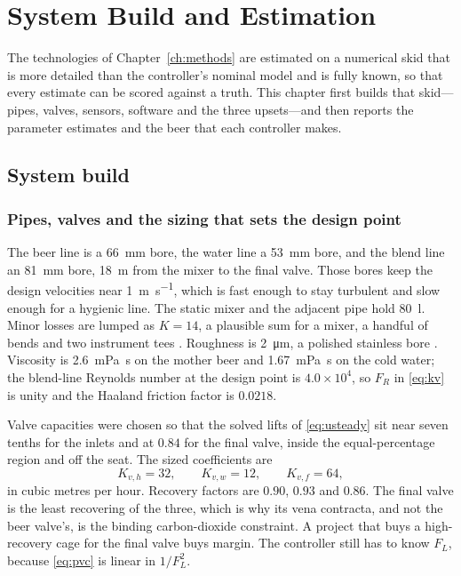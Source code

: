 \chapter{System Build and Estimation}
\label{ch:estimate}

The technologies of Chapter~\ref{ch:methods} are estimated on a numerical skid that is more detailed than the controller's nominal model and is fully known, so that every estimate can be scored against a truth. This chapter first builds that skid---pipes, valves, sensors, software and the three upsets---and then reports the parameter estimates and the beer that each controller makes.

\section{System build}
\label{sec:build}

\subsection{Pipes, valves and the sizing that sets the design point}

The beer line is a \SI{66}{\milli\metre} bore, the water line a \SI{53}{\milli\metre} bore, and the blend line an \SI{81}{\milli\metre} bore, \SI{18}{\metre} from the mixer to the final valve. Those bores keep the design velocities near \SI{1}{\metre\per\second}, which is fast enough to stay turbulent and slow enough for a hygienic line. The static mixer and the adjacent pipe hold \SI{80}{\litre}. Minor losses are lumped as $K=14$, a plausible sum for a mixer, a handful of bends and two instrument tees \citep{crane2009,paul2004}. Roughness is \SI{2}{\micro\metre}, a polished stainless bore \citep{white2011}. Viscosity is \SI{2.6}{\milli\pascal\second} on the mother beer and \SI{1.67}{\milli\pascal\second} on the cold water; the blend-line Reynolds number at the design point is $4.0\times 10^{4}$, so $F_R$ in \eqref{eq:kv} is unity and the Haaland friction factor is $0.0218$.

Valve capacities were chosen so that the solved lifts of \eqref{eq:usteady} sit near seven tenths for the inlets and at $0.84$ for the final valve, inside the equal-percentage region and off the seat. The sized coefficients are
\begin{equation}
K_{v,h} = 32,\qquad
K_{v,w} = 12,\qquad
K_{v,f} = 64,
\end{equation}
in cubic metres per hour. Recovery factors are $0.90$, $0.93$ and $0.86$. The final valve is the least recovering of the three, which is why its vena contracta, and not the beer valve's, is the binding carbon-dioxide constraint. A project that buys a high-recovery cage for the final valve buys margin. The controller still has to know $F_L$, because \eqref{eq:pvc} is linear in $1/F_L^{2}$.

